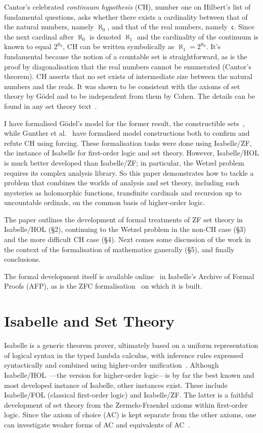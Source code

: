 \documentclass[runningheads]{llncs}
\begin{document}
Cantor's celebrated \textit{continuum hypothesis} (CH), number one on Hilbert's list of fundamental questions, asks whether there exists a cardinality between that of the natural numbers, namely $\aleph_0$, and that of the real numbers, namely~$\mathfrak{c}$.
Since the next cardinal after $\aleph_0$ is denoted $\aleph_1$ and the cardinality of the continuum is known to equal $2^{\aleph_0}$,  CH can be written symbolically as $\aleph_1 = 2^{\aleph_0}$.
It's fundamental because the notion of a countable set is straightforward, as is the proof by diagonalisation that the real numbers cannot be enumerated (Cantor's theorem).
CH asserts that no set exists of intermediate size between the natural numbers and the reals.
It was shown to be consistent with the axioms of set theory by Gödel and to be independent from them by Cohen.
The details can be found in any set theory text~\cite{kunen80}.

I have formalised Gödel's model for the former result, the constructible sets~\cite{paulson-consistency}, while
Gunther et al.\ \cite{Independence_CH-AFP} have formalised model constructions both to confirm and refute CH using forcing.
These formalisation tasks were done using Isabelle/ZF, the instance of Isabelle for first-order logic and set theory.
However, Isabelle/HOL is much better developed than Isabelle/ZF;
in particular, the Wetzel problem requires its complex analysis library. So this paper demonstrates how to tackle a problem that combines the worlds of analysis and set theory, including such mysteries as holomorphic functions, transfinite cardinals and recursion up to uncountable ordinals, on the common basis of higher-order logic.

The paper outlines the development of formal treatments of ZF set theory in Isabelle/HOL (\S2), continuing to the Wetzel problem in the non-CH case (\S3) and the more difficult CH case (\S4). Next comes some discussion of the work in the context of the formalisation of mathematics ganerally (\S5), and finally conclusions.

The formal development itself is available online~\cite{Wetzels_Problem-AFP} in Isabelle's Archive of Formal Proofs (AFP), as is the ZFC formalisation~\cite{ZFC_in_HOL-AFP} on which it is built.

\section{Isabelle and Set Theory}

Isabelle is a generic theorem prover, ultimately based on a uniform representation of logical syntax in the typed lambda calculus, with inference rules expressed syntactically and combined using higher-order unification~\cite{paulson-found}. Although Isabelle/HOL~\cite{isa-tutorial}---the version for higher-order logic---is by far the best known and most developed instance of Isabelle, other instances exist. These include Isabelle/FOL (classical first-order logic) and Isabelle/ZF\@.
The latter is a faithful development of set theory from the Zermelo-Fraenkel axioms within first-order logic.
Since the axiom of choice (AC) is kept separate from the other axioms, one can investigate weaker forms of AC and equivalents of AC~\cite{paulson-gr}. 
\end{document}
